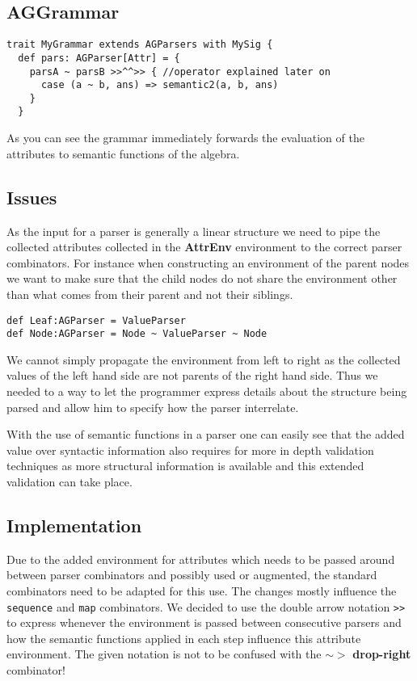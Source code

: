 \subsection{AGGrammar}
\begin{lstlisting}
trait MyGrammar extends AGParsers with MySig {
  def pars: AGParser[Attr] = {
    parsA ~ parsB >>^^>> { //operator explained later on
      case (a ~ b, ans) => semantic2(a, b, ans)
    }
  }
\end{lstlisting}

As you can see the grammar immediately forwards the evaluation of the attributes to semantic functions of the algebra. 

\subsection{Issues}
As the input for a parser is generally a linear structure we need to pipe the collected attributes collected in the \textbf{AttrEnv} environment to the correct parser combinators. For instance when constructing an environment of the parent nodes we want to make sure that the child nodes do not share the environment other than what comes from their parent and not their siblings.

\begin{lstlisting}
def Leaf:AGParser = ValueParser
def Node:AGParser = Node ~ ValueParser ~ Node
\end{lstlisting}

We cannot simply propagate the environment from left to right as the collected values of the left hand side are not parents of the right hand side. Thus we needed to a way to let the programmer express details about the structure being parsed and allow him to specify how the parser interrelate.

With the use of semantic functions in a parser one can easily see that the added value over syntactic information also requires for more in depth validation techniques as more structural information is available and this extended validation can take place.

\subsection{Implementation}
Due to the added environment for attributes which needs to be passed around between parser combinators and possibly used or augmented, the standard combinators need to be adapted for this use. The changes mostly influence the \verb/sequence/ and \verb/map/ combinators.
We decided to use the double arrow notation \verb/>>/ to express whenever the environment is passed between consecutive parsers and how the semantic functions applied in each step influence this attribute environment. The given notation is not to be confused with the $\sim >$ \textbf{drop-right} combinator!

